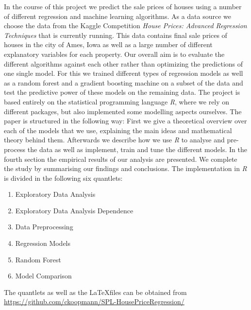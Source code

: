 In the course of this project we predict the sale prices of houses using a number of different regression and machine learning algorithms. As a data source we choose the data from the Kaggle Competition \textit{House Prices: Advanced Regression Techniques} that is currently running. This data contains final sale prices of houses in the city of Ames, Iowa as well as a large number of different explanatory variables for each property. Our overall aim is to evaluate the different algorithms against each other rather than optimizing the predictions of one single model. For this we trained different types of regression models as well as a random forest and a gradient boosting machine on a subset of the data and test the predictive power of these models on the remaining data. The project is based entirely on the statistical programming language \textit{R}, where we rely on different packages, but also implemented some modelling aspects ourselves. The paper is structured in the following way: First we give a theoretical overview over each of the models that we use, explaining the main ideas and mathematical theory behind them. Afterwards we describe how we use \textit{R} to  analyse and pre-process the data as well as implement, train and tune the different models. In the fourth section the empirical results of our analysis are presented. We complete the study by summarising our findings and conclusions. 
The implementation in \textit{R} is divided in the following six quantlets:
\begin{enumerate}
\item Exploratory Data Analysis
\item Exploratory Data Analysis Dependence
\item Data Preprocessing
\item Regression Models
\item Random Forest
\item Model Comparison
\end{enumerate}
The quantlets as well as the \LaTeX files can be obtained from \href{https://github.com/ckoopmann/SPL-HousePriceRegression/}{https://github.com/ckoopmann/SPL-HousePriceRegression/}

